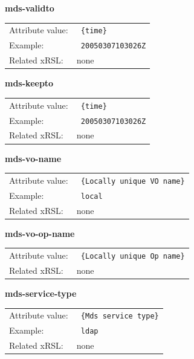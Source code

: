 \documentclass{article}
\begin{document}
  \hspace*{0.5cm}
  \begin{shaded}
    \textbf{mds-validto}
  \end{shaded}
  \begin{tabular}{lp{10cm}}  
    Attribute value:&\verb# {time}#\\
    Example: &\verb# 20050307103026Z#\\
    Related xRSL:&none \\
  \end{tabular}

  \hspace*{0.5cm}
  \begin{shaded}
    \textbf{mds-keepto}
  \end{shaded}
  \begin{tabular}{lp{10cm}}  
    Attribute value:&\verb# {time}#\\
    Example: &\verb# 20050307103026Z#\\
    Related xRSL:&none \\
  \end{tabular}

  \hspace*{0.5cm}
  \begin{shaded}
    \textbf{mds-vo-name}
  \end{shaded}
  \begin{tabular}{lp{10cm}}  
    Attribute value:&\verb# {Locally unique VO name}#\\
    Example: &\verb# local #\\
    Related xRSL:&none \\
  \end{tabular}

  \hspace*{0.5cm}
  \begin{shaded}
    \textbf{mds-vo-op-name}
  \end{shaded}
  \begin{tabular}{lp{10cm}}  
    Attribute value:&\verb# {Locally unique Op name}#\\
    Related xRSL:&none \\
  \end{tabular}

  \hspace*{0.5cm}
  \begin{shaded}
    \textbf{mds-service-type}
  \end{shaded}
  \begin{tabular}{lp{10cm}}  
    Attribute value:&\verb# {Mds service type}#\\
    Example: &\verb# ldap #\\
    Related xRSL:&none \\
  \end{tabular}
\end{document}
